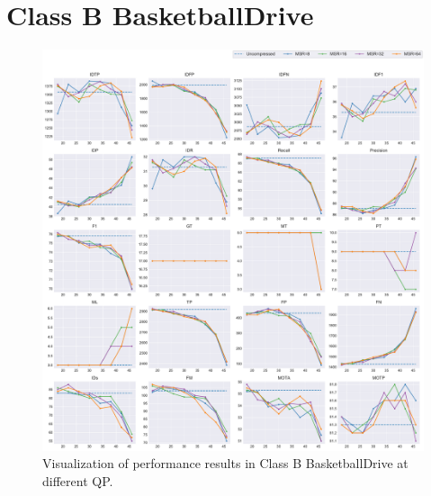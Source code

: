 
\section{Class B BasketballDrive}
\label{sec:appendix/BasketballDrive_all}


\begin{figure}[!htbp]
\centering
\includegraphics[width=1.0\linewidth]{img/appendix/BasketballDrive_all_multiplots_qp.pdf}
\caption[Visualization of performance results in Class B BasketballDrive at different QP]
{Visualization of performance results in Class B BasketballDrive at different QP.}
\label{fig:BasketballDrive_all_qp}
\end{figure}

